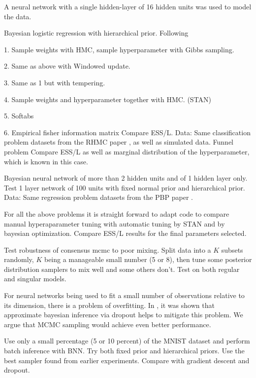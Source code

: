 \documentclass[12pt]{report}
\begin{document}
\begin{enumerate}
A neural network with a single hidden-layer of 16 hidden units was used to model
the data.

Bayesian logistic regression with hierarchical prior. Following \cite{zhang2014semi}

1. Sample weights with HMC, sample hyperparameter with Gibbs sampling.

2. Same as above with Windowed update.

3. Same as 1 but with tempering. 

4. Sample weights and hyperparameter together with HMC. (STAN)

5. Softabs 

6. Empirical fisher information matrix 
Compare ESS/L.
Data: Same classification problem datasets from the RHMC paper \cite{girolami2011riemann}, as well as simulated data.
Funnel problem
Compare ESS/L as well as marginal distribution of the hyperparameter, which is known in this case. 

Bayesian neural network of more than 2 hidden units and of 1 hidden layer only. Test 1 layer network of 100 units with fixed normal prior and hierarchical prior.
Data: Same regression problem datasets from the PBP paper \cite{hernandez2015probabilistic}. 


For all the above problems it is straight forward to adapt code to compare manual hyperaparameter tuning with automatic tuning by STAN and by bayesian optimization. Compare ESS/L results for the final parameters selected. 

Test robustness of consensus mcmc to poor mixing. Split data into a $K$ subsets randomly, $K$ being a manageable small number (5 or 8), then tune some posterior distribution samplers to mix well and some others don't. Test on both regular and singular models.
 
For neural networks being used to fit a small number of observations relative to its dimension, there is a problem of overfitting. In \cite{gal2015bayesian}, it was shown that approximate bayesian inference via dropout helps to mitigate this problem. We argue that MCMC sampling would achieve even better performance.

Use only a small percentage (5 or 10 percent) of the MNIST dataset and perform batch inference with BNN. Try both fixed prior and hierarchical priors. Use the best sampler found from earlier experiments. 
Compare with gradient descent and dropout. 


\end{enumerate}
\end{document}
